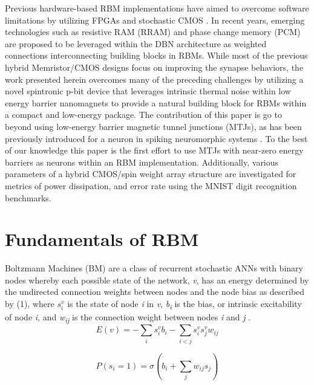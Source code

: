 Previous hardware-based RBM implementations have aimed to overcome software limitations by utilizing FPGAs \cite{Kim2010,Ly2010} and stochastic CMOS \cite{Ardakani2017}. In recent years, emerging technologies such as resistive RAM (RRAM) \cite{SHERI2015,Bojnordi2016} and phase change memory (PCM) \cite{Eryilmaz2016} are proposed to be leveraged within the DBN architecture as weighted connections interconnecting building blocks in RBMs. While most of the previous hybrid Memristor/CMOS designs focus on improving the synapse behaviors, the work presented herein overcomes many of the preceding challenges by utilizing a novel spintronic p-bit device that leverages intrinsic thermal noise within low energy barrier nanomagnets to provide a natural building block for RBMs within a compact and low-energy package. The contribution of this paper is go to beyond using low-energy barrier magnetic tunnel junctions (MTJs), as has been previously introduced for a neuron in spiking neuromorphic systems \cite{sengupta2016magnetic,Sengupta2016prob}. To the best of our knowledge this paper is the first effort to use MTJs with near-zero energy barriers as neurons within an RBM implementation. Additionally, various parameters of a hybrid CMOS/spin weight array structure are investigated for metrics of power dissipation, and error rate using the MNIST digit recognition benchmarks.
 


\section{Fundamentals of RBM}
Boltzmann Machines (BM) are a class of recurrent stochastic ANNs with binary nodes whereby each possible state of the network, \textit{v}, has an energy determined by the undirected connection weights between nodes and the node bias as described by (1), where $s_i^v$ is the state of node \textit{i} in \textit{v}, \textit{b\textsubscript{i}} is the bias, or intrinsic excitability of node \textit{i}, and \textit{w\textsubscript{ij}} is the connection weight between nodes \textit{i} and \textit{j} \cite{ackley1985}.
\begin{equation}
  E(v) = -\sum_{i} s_i^v b_i -\sum_{i<j} s_i^v s_j^v w_{ij} 
\end{equation}

\begin{equation}
  P(s_i = 1) = \sigma (b_i + \sum_{j} w_{ij} s_j)
\end{equation}

